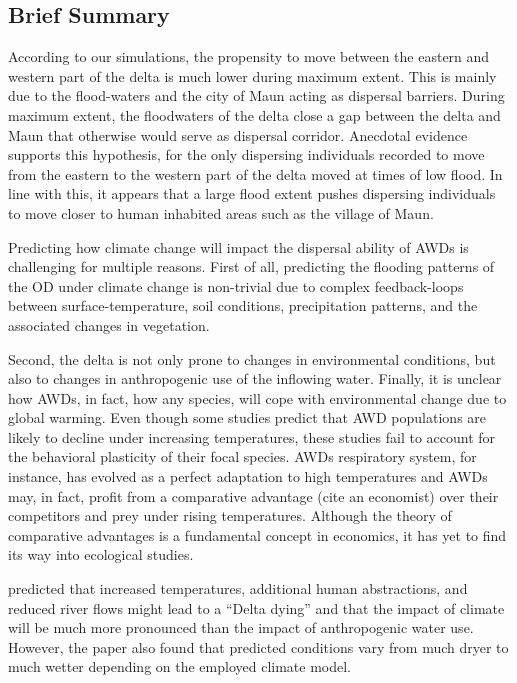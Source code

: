 \documentclass[abstract=on,10pt,a4paper,bibliography=totocnumbered]{article}
\begin{document}
\subsection{Brief Summary}
According to our simulations, the propensity to move between the eastern and
western part of the delta is much lower during maximum extent. This is mainly
due to the flood-waters and the city of Maun acting as dispersal barriers.
During maximum extent, the floodwaters of the delta close a gap between the
delta and Maun that otherwise would serve as dispersal corridor. Anecdotal
evidence supports this hypothesis, for the only dispersing individuals recorded
to move from the eastern to the western part of the delta moved at times of low
flood. In line with this, it appears that a large flood extent pushes dispersing
individuals to move closer to human inhabited areas such as the village of Maun.

Predicting how climate change will impact the dispersal ability of AWDs is
challenging for multiple reasons. First of all, predicting the flooding patterns
of the OD under climate change is non-trivial due to complex feedback-loops
between surface-temperature, soil conditions, precipitation patterns, and the
associated changes in vegetation.

Second, the delta is not only prone to changes
in environmental conditions, but also to changes in anthropogenic use of the
inflowing water. Finally, it is unclear how AWDs, in fact, how any
species, will cope with environmental change due to global warming. Even though
some studies predict that AWD populations are likely to decline under increasing
temperatures, these studies fail to account for the behavioral plasticity of
their focal species. AWDs respiratory system, for instance, has evolved as a
perfect adaptation to high temperatures and AWDs may, in fact, profit from a
comparative advantage (cite an economist) over their competitors and prey under
rising temperatures. Although the theory of comparative advantages is a
fundamental concept in economics, it has yet to find its way into ecological
studies.

\cite{Murray-Hudson.2006} predicted that increased temperatures, additional human
abstractions, and reduced river flows might lead to a ``Delta dying'' and that
the impact of climate will be much more pronounced than the impact of
anthropogenic water use. However, the paper also found that predicted conditions
vary from much dryer to much wetter depending on the employed climate model.
\end{document}
